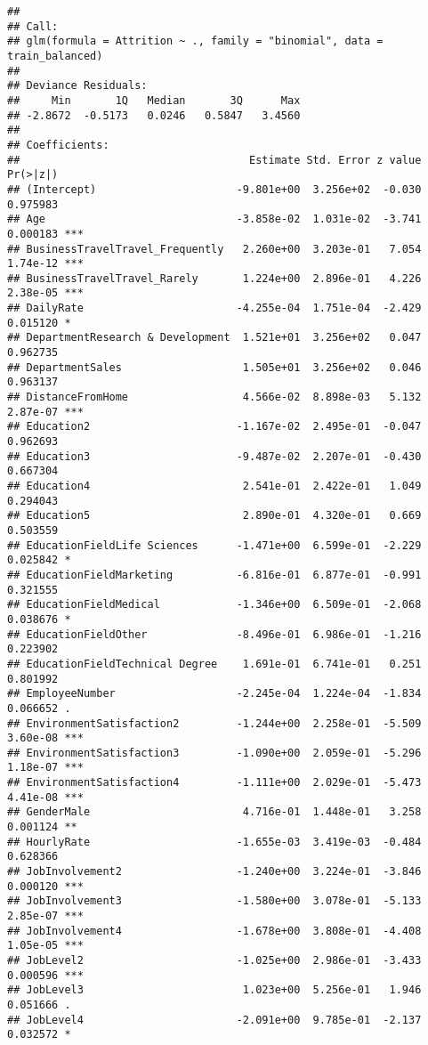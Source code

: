 \documentclass[
]{article}
\begin{document}
\begin{verbatim}
## 
## Call:
## glm(formula = Attrition ~ ., family = "binomial", data = train_balanced)
## 
## Deviance Residuals: 
##     Min       1Q   Median       3Q      Max  
## -2.8672  -0.5173   0.0246   0.5847   3.4560  
## 
## Coefficients:
##                                    Estimate Std. Error z value Pr(>|z|)    
## (Intercept)                      -9.801e+00  3.256e+02  -0.030 0.975983    
## Age                              -3.858e-02  1.031e-02  -3.741 0.000183 ***
## BusinessTravelTravel_Frequently   2.260e+00  3.203e-01   7.054 1.74e-12 ***
## BusinessTravelTravel_Rarely       1.224e+00  2.896e-01   4.226 2.38e-05 ***
## DailyRate                        -4.255e-04  1.751e-04  -2.429 0.015120 *  
## DepartmentResearch & Development  1.521e+01  3.256e+02   0.047 0.962735    
## DepartmentSales                   1.505e+01  3.256e+02   0.046 0.963137    
## DistanceFromHome                  4.566e-02  8.898e-03   5.132 2.87e-07 ***
## Education2                       -1.167e-02  2.495e-01  -0.047 0.962693    
## Education3                       -9.487e-02  2.207e-01  -0.430 0.667304    
## Education4                        2.541e-01  2.422e-01   1.049 0.294043    
## Education5                        2.890e-01  4.320e-01   0.669 0.503559    
## EducationFieldLife Sciences      -1.471e+00  6.599e-01  -2.229 0.025842 *  
## EducationFieldMarketing          -6.816e-01  6.877e-01  -0.991 0.321555    
## EducationFieldMedical            -1.346e+00  6.509e-01  -2.068 0.038676 *  
## EducationFieldOther              -8.496e-01  6.986e-01  -1.216 0.223902    
## EducationFieldTechnical Degree    1.691e-01  6.741e-01   0.251 0.801992    
## EmployeeNumber                   -2.245e-04  1.224e-04  -1.834 0.066652 .  
## EnvironmentSatisfaction2         -1.244e+00  2.258e-01  -5.509 3.60e-08 ***
## EnvironmentSatisfaction3         -1.090e+00  2.059e-01  -5.296 1.18e-07 ***
## EnvironmentSatisfaction4         -1.111e+00  2.029e-01  -5.473 4.41e-08 ***
## GenderMale                        4.716e-01  1.448e-01   3.258 0.001124 ** 
## HourlyRate                       -1.655e-03  3.419e-03  -0.484 0.628366    
## JobInvolvement2                  -1.240e+00  3.224e-01  -3.846 0.000120 ***
## JobInvolvement3                  -1.580e+00  3.078e-01  -5.133 2.85e-07 ***
## JobInvolvement4                  -1.678e+00  3.808e-01  -4.408 1.05e-05 ***
## JobLevel2                        -1.025e+00  2.986e-01  -3.433 0.000596 ***
## JobLevel3                         1.023e+00  5.256e-01   1.946 0.051666 .  
## JobLevel4                        -2.091e+00  9.785e-01  -2.137 0.032572 *  

\end{verbatim}
\end{document}
